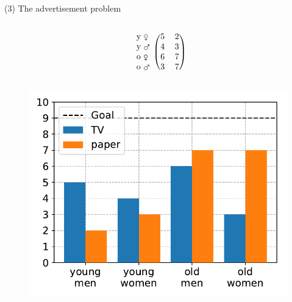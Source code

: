 \documentclass[11pt, aspectratio=149]{beamer}
\theoremstyle{plain}
\begin{document}
\begin{frame}[fragile, t]{(3) The advertisement problem}
\begin{columns}
\begin{column}{0.4\textwidth}
\[\begin{blockarray}{rcc}
			\begin{block}{l(cc)}
			\text{y \female}  & 5 &  2 \\
			\text{y \mars}  & 4 &  3 \\
			\text{o \female}  & 6 &  7 \\
			\text{o \mars}  & 3 &  7 \\
			\end{block}
			\end{blockarray}
			\]
			\vspace*{-3em}
			\begin{figure}
				\centering
				\includegraphics[width=1.0\linewidth]{figs/advertisement_statement.pdf}
			\end{figure}
		\end{column}
	\end{columns}
\end{frame}
\end{document}
